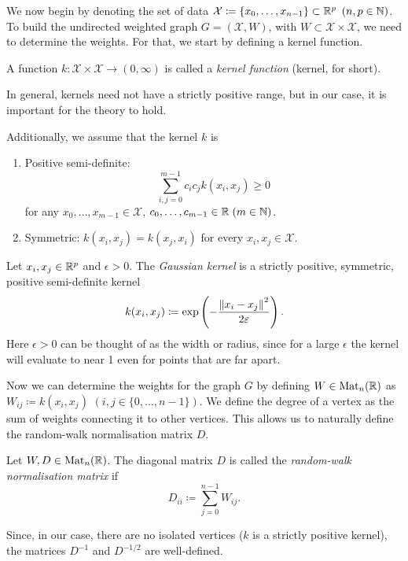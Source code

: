 We now begin by denoting the set of data $\mathcal{X}\coloneqq\{x_0,\dots,x_{n-1}\}\subset\mathbb{R}^p$ $(n,p\in\mathbb{N})$. To build the undirected weighted graph $G=(\mathcal{X}, W)$, with $W\subset\mathcal{X}\times\mathcal{X}$, we need to determine the weights. For that, we start by defining a kernel function. 
\begin{df}
     A function $k:\mathcal{X}\times\mathcal{X}\to(0,\infty)$ is called a \textit{kernel function} (kernel, for short). 

    In general, kernels need not have a strictly positive range, but in our case, it is important for the theory to hold.
\end{df}

Additionally, we assume that the kernel $k$ is 
\begin{enumerate}
    \renewcommand{\labelenumi}{\arabic{enumi}.}
    \item Positive semi-definite:
      \begin{equation*}
          \sum\limits_{i,j=0}^{m-1}c_ic_jk(x_i,x_j)\geq 0
      \end{equation*}
      for any $x_0,\dots, x_{m-1}\in \mathcal{X}$, $c_0,\dots, c_{m-1}\in\mathbb{R}\; (m\in\mathbb{N})$.
    \item Symmetric: $k(x_i,x_j)=k(x_j,x_i)$ for every $x_i,x_j\in\mathcal{X}$.
\end{enumerate}

\begin{ex}\label{ex:gaussian_kernel}
    Let $x_i,x_j\in\mathbb{R}^p$ and $\epsilon>0$. The \textit{Gaussian kernel} is a strictly positive, symmetric, positive semi-definite kernel
    \begin{align*}
    k(x_i,x_j) \coloneqq \exp\left(-\frac{\left\lVert x_i-x_j\right\rVert^2}{2\varepsilon}\right).
    \end{align*}
Here $\epsilon >0$ can be thought of as the width or radius, since for a large $\epsilon$ the kernel will evaluate to near 1 even for points that are far apart.
\end{ex}


Now we can determine the weights for the graph $G$ by defining $W\in\text{Mat}_n(\mathbb{R})$ as $W_{ij}\coloneqq k(x_i,x_j)$ $(i,j\in\{0,\dots,n-1\})$. We define the degree of a vertex as the sum of weights connecting it to other vertices. This allows us to naturally define the random-walk normalisation matrix $D$.

\begin{df}
    Let $W, D\in\text{Mat}_n(\mathbb{R})$. The diagonal matrix $D$ is called the \textit{random-walk normalisation matrix} if
    $$
    D_{ii}\coloneqq\sum\limits_{j=0}^{n-1}W_{ij}.
    $$
\end{df}
Since, in our case, there are no isolated vertices ($k$ is a strictly positive kernel), the matrices $D^{-1}$ and $D^{-1/2}$ are well-defined.

